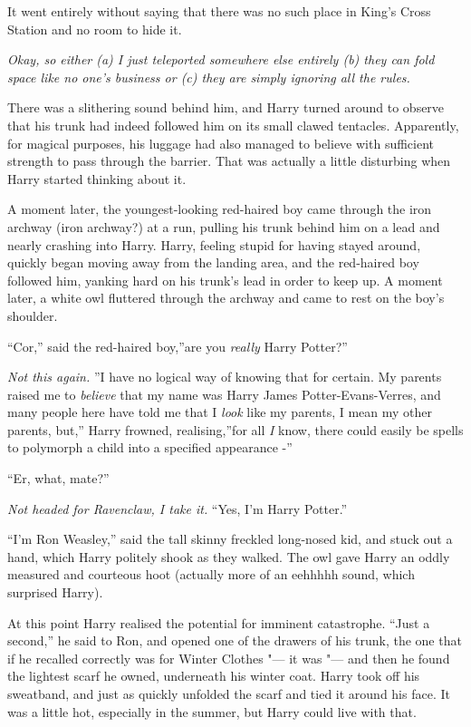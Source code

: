 It went entirely without saying that there was no such place in King's
Cross Station and no room to hide it.

\emph{Okay, so either (a) I just teleported somewhere else entirely (b)
they can fold space like no one's business or (c) they are simply
ignoring all the rules.}

There was a slithering sound behind him, and Harry turned around to
observe that his trunk had indeed followed him on its small clawed
tentacles. Apparently, for magical purposes, his luggage had also
managed to believe with sufficient strength to pass through the barrier.
That was actually a little disturbing when Harry started thinking about
it.

A moment later, the youngest-looking red-haired boy came through the
iron archway (iron archway?) at a run, pulling his trunk behind him on a
lead and nearly crashing into Harry. Harry, feeling stupid for having
stayed around, quickly began moving away from the landing area, and the
red-haired boy followed him, yanking hard on his trunk's lead in order
to keep up. A moment later, a white owl fluttered through the archway
and came to rest on the boy's shoulder.

``Cor,'' said the red-haired boy,''are you \emph{really} Harry Potter?''

\emph{Not this again.} ''I have no logical way of knowing that for
certain. My parents raised me to \emph{believe} that my name was Harry
James Potter-Evans-Verres, and many people here have told me that I
\emph{look} like my parents, I mean my other parents, but,'' Harry
frowned, realising,''for all \emph{I} know, there could easily be spells
to polymorph a child into a specified appearance -''

``Er, what, mate?''

\emph{Not headed for Ravenclaw, I take it.} ``Yes, I'm Harry Potter.''

``I'm Ron Weasley,'' said the tall skinny freckled long-nosed kid, and
stuck out a hand, which Harry politely shook as they walked. The owl
gave Harry an oddly measured and courteous hoot (actually more of an
eehhhhh sound, which surprised Harry).

At this point Harry realised the potential for imminent catastrophe.
``Just a second,'' he said to Ron, and opened one of the drawers of his
trunk, the one that if he recalled correctly was for Winter Clothes "--- it
was "--- and then he found the lightest scarf he owned, underneath his
winter coat. Harry took off his sweatband, and just as quickly unfolded
the scarf and tied it around his face. It was a little hot, especially
in the summer, but Harry could live with that.

